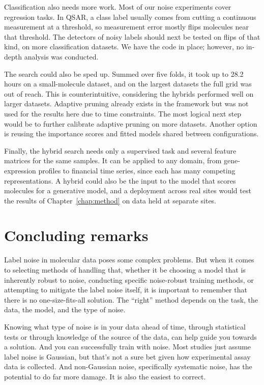 Classification also needs more work. Most of our noise experiments cover regression tasks. In QSAR, a class label usually comes from cutting a continuous measurement at a threshold, so measurement error mostly flips molecules near that threshold. The detectors of noisy labels should next be tested on flips of that kind, on more classification datasets. We have the code in place; however, no in-depth analysis was conducted. 

The search could also be sped up. Summed over five folds, it took up to 28.2 hours on a small-molecule dataset, and on the largest datasets the full grid was out of reach. This is counterintuitive, considering the hybrids performed well on larger datasets. Adaptive pruning already exists in the framework but was not used for the results here due to time constraints. The most logical next step would be to further calibrate adaptive pruning on more datasets. Another option is reusing the importance scores and fitted models shared between configurations.

Finally, the hybrid search needs only a supervised task and several feature matrices for the same samples. It can be applied to any domain, from gene-expression profiles to financial time series, since each has many competing representations. A hybrid could also be the input to the model that scores molecules for a generative model, and a deployment across real sites would test the results of Chapter~\ref{chap:method} on data held at separate sites.

\section{Concluding remarks}\label{sec:discussion:conclusions}\label{sec:discussion:claim}

Label noise in molecular data poses some complex problems. But when it comes to selecting methods of handling that, whether it be choosing a model that is inherently robust to noise, conducting specific noise-robust training methods, or attempting to mitigate the label noise itself, it is important to remember that there is no one-size-fits-all solution. The ``right'' method depends on the task, the data, the model, and the type of noise.

Knowing what type of noise is in your data ahead of time, through statistical tests or through knowledge of the source of the data, can help guide you towards a solution. And you can successfully train with noise. Most studies just assume label noise is Gaussian, but that's not a sure bet given how experimental assay data is collected. And non-Gaussian noise, specifically systematic noise, has the potential to do far more damage. It is also the easiest to correct. 

